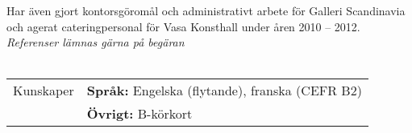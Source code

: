 \documentclass[letterpaper,11pt,oneside]{article}
\begin{document}
Har även gjort kontorsgöromål och administrativt arbete för Galleri Scandinavia och agerat cateringpersonal för Vasa Konsthall under åren 2010 – 2012.
\\ \newline
\textit{Referenser lämnas gärna på begäran}
\\
\\

\noindent \begin{tabular}{@{} l l}
    \Large{Kunskaper} & \textbf{Språk:} Engelska (flytande), franska (CEFR B2) \\
                      & \textbf{Övrigt:} B-körkort
 \end{tabular}
\newpage


\end{document}
